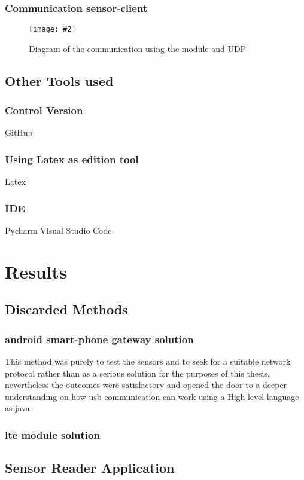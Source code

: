 \documentclass[hidelinks,11pt,a4paper,oneside,article]{memoir}
\newcommand{\putimage}[3][10] %
{
\begin{figure}[h]
	\centering
	\captionsetup{justification=centering}
	\texttt{[image: \#2]}
	\caption{#3}
	\label{fig:#2}
\end{figure}
}
\begin{document}

\subsection{Communication sensor-client}
\putimage{communication_udp}{Diagram of the communication using the module and UDP}
\section{Other Tools used}
\subsection{Control Version}
GitHub
\subsection{Using Latex as edition tool}
Latex
\subsection{IDE}
Pycharm
Visual Studio Code

\chapter{Results}

\section{Discarded Methods}
\subsection{android smart-phone gateway solution}
This method was purely to test the sensors and to seek for a suitable network protocol rather than as a serious solution for the purposes of this thesis, nevertheless the outcomes were satisfactory and opened the door to a deeper understanding on how \gls{usb} communication can work using a High level language as \gls{java}.
\subsection{\gls{lte} module solution}


\section{Sensor Reader Application}
\end{document}
